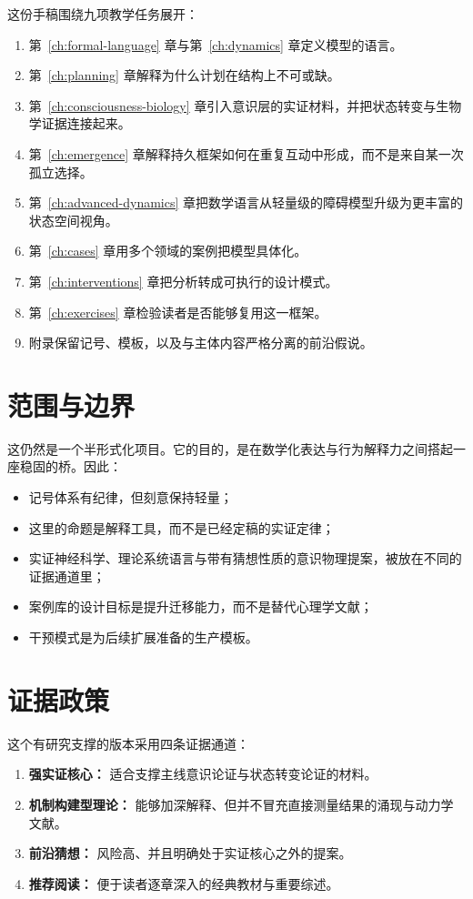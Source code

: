 这份手稿围绕九项教学任务展开：
\begin{enumerate}[nosep]
  \item 第~\ref{ch:formal-language} 章与第~\ref{ch:dynamics} 章定义模型的语言。
  \item 第~\ref{ch:planning} 章解释为什么计划在结构上不可或缺。
  \item 第~\ref{ch:consciousness-biology} 章引入意识层的实证材料，并把状态转变与生物学证据连接起来。
  \item 第~\ref{ch:emergence} 章解释持久框架如何在重复互动中形成，而不是来自某一次孤立选择。
  \item 第~\ref{ch:advanced-dynamics} 章把数学语言从轻量级的障碍模型升级为更丰富的状态空间视角。
  \item 第~\ref{ch:cases} 章用多个领域的案例把模型具体化。
  \item 第~\ref{ch:interventions} 章把分析转成可执行的设计模式。
  \item 第~\ref{ch:exercises} 章检验读者是否能够复用这一框架。
  \item 附录保留记号、模板，以及与主体内容严格分离的前沿假说。
\end{enumerate}

\section{范围与边界}

这仍然是一个半形式化项目。它的目的，是在数学化表达与行为解释力之间搭起一座稳固的桥。因此：
\begin{itemize}[nosep]
  \item 记号体系有纪律，但刻意保持轻量；
  \item 这里的命题是解释工具，而不是已经定稿的实证定律；
  \item 实证神经科学、理论系统语言与带有猜想性质的意识物理提案，被放在不同的证据通道里；
  \item 案例库的设计目标是提升迁移能力，而不是替代心理学文献；
  \item 干预模式是为后续扩展准备的生产模板。
\end{itemize}

\section{证据政策}

这个有研究支撑的版本采用四条证据通道：
\begin{enumerate}[nosep]
  \item \textbf{强实证核心：} 适合支撑主线意识论证与状态转变论证的材料。
  \item \textbf{机制构建型理论：} 能够加深解释、但并不冒充直接测量结果的涌现与动力学文献。
  \item \textbf{前沿猜想：} 风险高、并且明确处于实证核心之外的提案。
  \item \textbf{推荐阅读：} 便于读者逐章深入的经典教材与重要综述。
\end{enumerate}

